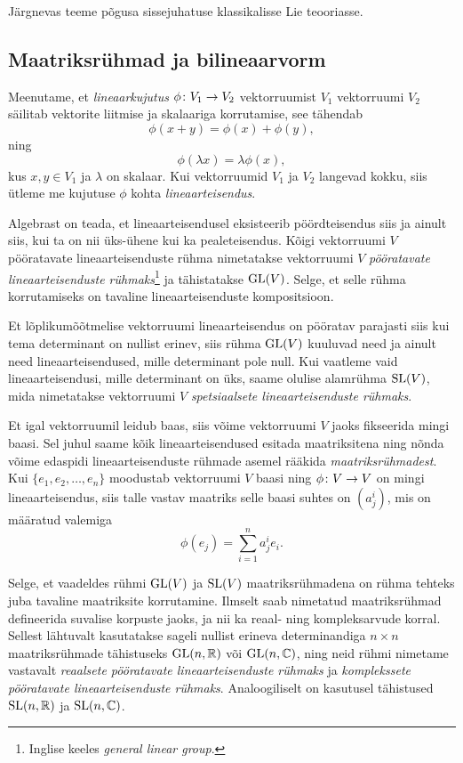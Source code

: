 Järgnevas teeme põgusa sissejuhatuse klassikalisse Lie teooriasse.

\subsection{Maatriksrühmad ja bilineaarvorm}\label{subsec:mat-ryhmad-ja-bilinvorm}

Meenutame, et \emph{lineaarkujutus}
$\phi \colon V_1 \to V_2$ vektorruumist $V_1$ vektorruumi $V_2$ säilitab
vektorite liitmise ja skalaariga korrutamise, see tähendab
\[ \phi(x + y) = \phi(x) + \phi(y), \]
ning
\[ \phi(\lambda x) = \lambda \phi(x), \]
kus $x, y \in V_1$ ja $\lambda$ on skalaar. Kui vektorruumid $V_1$ ja $V_2$
langevad kokku, siis ütleme me kujutuse $\phi$ kohta \emph{lineaarteisendus}.

Algebrast on teada, et lineaarteisendusel eksisteerib pöördteisendus siis ja
ainult siis, kui ta on nii üks-ühene kui ka pealeteisendus. Kõigi vektorruumi $V$
pööratavate lineaarteisenduste rühma nimetatakse vektorruumi $V$
\emph{pööratavate lineaarteisenduste rühmaks}\footnote{Inglise keeles
\emph{general linear group}.} ja tähistatakse $\operatorname{GL}(V)$. Selge, et selle
rühma korrutamiseks on tavaline lineaarteisenduste kompositsioon.

Et lõplikumõõtmelise vektorruumi lineaarteisendus on pööratav parajasti siis
kui tema determinant on nullist erinev, siis rühma $\operatorname{GL}(V)$ kuuluvad
need ja ainult need lineaarteisendused, mille determinant pole null.
Kui vaatleme vaid lineaarteisendusi, mille determinant on üks, saame olulise
alamrühma $\operatorname{SL}(V)$, mida nimetatakse vektorruumi $V$
\emph{spetsiaalsete lineaarteisenduste rühmaks}.

Et igal vektorruumil leidub baas, siis võime vektorruumi $V$ jaoks
fikseerida mingi baasi. Sel juhul
saame kõik lineaarteisendused esitada maatriksitena ning nõnda võime
edaspidi lineaarteisenduste rühmade asemel rääkida \emph{maatriksrühmadest}.
Kui $\{e_1, e_2, \dots, e_n\}$ moodustab vektorruumi $V$ baasi ning
$\phi \colon V \to V$ on mingi lineaarteisendus, siis talle vastav maatriks
selle baasi suhtes on $(a^i_j)$, mis on määratud valemiga
\[ \phi(e_j) = \sum_{i=1}^{n} a^i_j e_i. \]

Selge, et vaadeldes rühmi $\operatorname{GL}(V)$ ja $\operatorname{SL}(V)$ maatriksrühmadena
on rühma tehteks juba tavaline maatriksite korrutamine. Ilmselt saab
nimetatud maatriksrühmad defineerida suvalise korpuste jaoks, ja nii ka
reaal- ning kompleksarvude korral. Sellest lähtuvalt kasutatakse sageli
nullist erineva determinandiga $n \times n$ maatriksrühmade tähistuseks
$\operatorname{GL}(n, \mathbb{R})$ või $\operatorname{GL}(n, \mathbb{C})$, ning neid rühmi nimetame vastavalt
\emph{reaalsete pööratavate lineaarteisenduste rühmaks} ja \emph{komplekssete
pööratavate lineaarteisenduste rühmaks}. Analoogiliselt on kasutusel
tähistused $\operatorname{SL}(n, \mathbb{R})$ ja $\operatorname{SL}(n, \mathbb{C})$.


